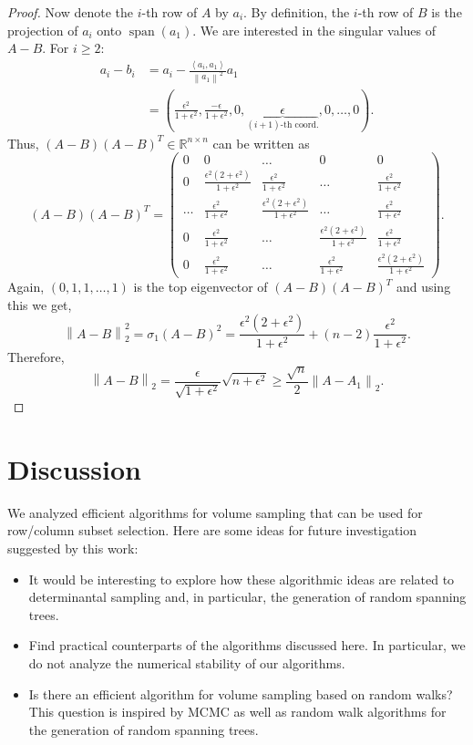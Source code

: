 \documentclass[11pt]{article}
\def\reals{\mathbb{R}}
\def\eps{\epsilon}
\newcommand{\linspan}[1]{\operatorname{span}\left(#1\right)}
\newcommand{\norm}[1]{\left\|#1\right\|}
\newcommand{\inner}[2]{\left\langle#1, #2\right\rangle}
\begin{document}
\begin{proof}
Now denote the $i$-th row of $A$ by $a_{i}$. By definition, the $i$-th row of $B$ is the projection of $a_{i}$ onto $\linspan{a_{1}}$. We are interested in the singular values of $A-B$. For $i \geq 2$:
\begin{align*}
a_{i} - b_{i} & = a_{i} - \frac{\inner{a_{i}}{a_{1}}}{\norm{a_{1}}^{2}} a_{1} \\
& = \left(\frac{\eps^{2}}{1+\eps^{2}}, \frac{-\eps}{1+\eps^{2}}, 0, \underset{\overbrace{\text{$(i+1)$-th coord.}}}{\eps}, 0, \dotsc, 0\right).
\end{align*}
Thus, $(A-B)(A-B)^{T} \in \reals^{n \times n}$ can be written as
\[
(A-B)(A-B)^{T} = \left(\begin{array}{ccccc}
0 & 0 & \dotsc & 0 & 0 \\
0 & \frac{\eps^{2}(2+\eps^{2})}{1+\eps^{2}} & \frac{\eps^{2}}{1+\eps^{2}} & \dotsc & \frac{\eps^{2}}{1+\eps^{2}} \\
\dotsc & \frac{\eps^{2}}{1+\eps^{2}} & \frac{\eps^{2}(2+\eps^{2})}{1+\eps^{2}} & \dotsc & \frac{\eps^{2}}{1+\eps^{2}} \\
0 & \frac{\eps^{2}}{1+\eps^{2}} & \dotsc & \frac{\eps^{2}(2+\eps^{2})}{1+\eps^{2}} & \frac{\eps^{2}}{1+\eps^{2}} \\
0 & \frac{\eps^{2}}{1+\eps^{2}} & \dotsc & \frac{\eps^{2}}{1+\eps^{2}} & \frac{\eps^{2}(2+\eps^{2})}{1+\eps^{2}}
\end{array}\right).
\]
Again, $(0, 1, 1, \dotsc, 1)$ is the top eigenvector of $(A-B)(A-B)^{T}$ and using this we get,
\[
\norm{A-B}_{2}^{2} = \sigma_{1}(A-B)^{2} = \frac{\eps^{2}(2+\eps^{2})}{1+\eps^{2}} + (n-2) \frac{\eps^{2}}{1+\eps^{2}}.
\]
Therefore,
\[
\norm{A-B}_{2} = \frac{\eps}{\sqrt{1+\eps^{2}}} \sqrt{n+\eps^{2}} \geq \frac{\sqrt{n}}{2} \norm{A-A_{1}}_{2}.
\]
\end{proof}

\section{Discussion}


We analyzed efficient algorithms for volume sampling that can be used for row/column subset selection. Here are some ideas for future investigation suggested by this work:
\begin{itemize}
\item It would be interesting to explore how these algorithmic ideas are related to determinantal sampling \cite{lyons2003determinantal,hough2006determinantal} and, in particular, the generation of random spanning trees.

\item Find practical counterparts of the algorithms discussed here. In particular, we do not analyze the numerical stability of our algorithms.

\item Is there an efficient algorithm for volume sampling based on random walks? This question is inspired by MCMC as well as random walk algorithms for the generation of random spanning trees.
\end{itemize}



    

\end{document}
